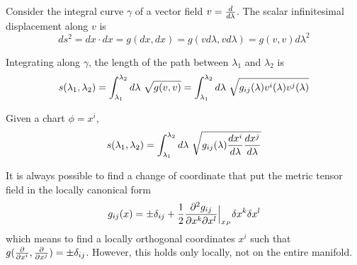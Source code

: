     Consider the integral curve $\gamma$ of a vector field $v = \frac{d}{d\lambda}$. The scalar infinitesimal displacement along $v$ is 
    \begin{equation*}
        ds^2 = dx \cdot dx = g(dx, dx) = g(v d\lambda, v d\lambda) = g(v,v) d\lambda^2
    \end{equation*}

    Integrating along $\gamma$, the length of the path between $\lambda_1$ and $\lambda_2$ is 
    \begin{equation*}
        s(\lambda_1, \lambda_2) = \int_{\lambda_1}^{\lambda_2}d\lambda~ \sqrt{g(v,v)} = \int_{\lambda_1}^{\lambda_2}d\lambda~ \sqrt{g_{ij}(\lambda) v^i(\lambda) v^j(\lambda)}
    \end{equation*}

    Given a chart $\phi = x^i$, 
    \begin{equation*}
        s(\lambda_1, \lambda_2) = \int_{\lambda_1}^{\lambda_2}d\lambda~ \sqrt{g_{ij}(\lambda) \frac{dx^i}{d\lambda} \frac{dx^j}{d\lambda}}
    \end{equation*}


    It is always possible to find a change of coordinate that put the metric tensor field in the locally canonical form
    \begin{equation*}
        g_{ij} (x) = \pm \delta_{ij} + \frac{1}{2} \frac{\partial^2 g_{ij}}{\partial x^k \partial x^l} \Big\vert_{x_P} \delta x^k \delta x^l
    \end{equation*}
    which means to find a locally orthogonal coordinates $x^i$ such that $g(\frac{\partial}{\partial x^i}, \frac{\partial}{\partial x^j}) = \pm \delta_{ij}$. However, this holds only locally, not on the entire manifold.

